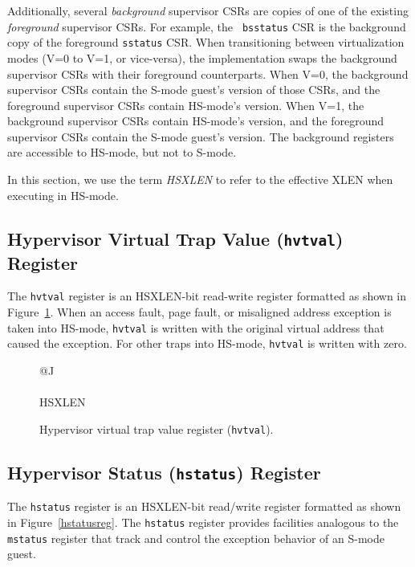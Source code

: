 Additionally, several {\em background} supervisor CSRs are copies of one of
the existing {\em foreground} supervisor CSRs.  For example, the {\tt
bsstatus} CSR is the background copy of the foreground {\tt sstatus} CSR.
When transitioning between virtualization modes (V=0 to V=1, or vice-versa),
the implementation swaps the background supervisor CSRs with their foreground
counterparts.  When V=0, the background supervisor CSRs contain the S-mode
guest's version of those CSRs, and the foreground supervisor CSRs contain
HS-mode's version.  When V=1, the background supervisor CSRs contain HS-mode's
version, and the foreground supervisor CSRs contain the S-mode guest's
version.  The background registers are accessible to HS-mode, but not to S-mode.

In this section, we use the term {\em HSXLEN} to refer to the effective XLEN
when executing in HS-mode.

\subsection{Hypervisor Virtual Trap Value ({\tt hvtval}) Register}

The {\tt hvtval} register is an HSXLEN-bit read-write register formatted as shown
in Figure~\ref{hvtvalreg}.  When an access fault, page fault, or misaligned
address exception is taken into HS-mode, {\tt hvtval} is
written with the original virtual address that caused the exception.
For other traps into HS-mode, {\tt hvtval} is written with zero.

\begin{figure}[h!]
{\footnotesize
\begin{center}
\begin{tabular}{@{}J}
 \\
\hline
{} \\
\hline
HSXLEN \\
\end{tabular}
\end{center}
}
\vspace{-0.1in}
\caption{Hypervisor virtual trap value register ({\tt hvtval}).}
\label{hvtvalreg}
\end{figure}

\subsection{Hypervisor Status ({\tt hstatus}) Register}

The {\tt hstatus} register is an HSXLEN-bit read/write register
formatted as shown in Figure~\ref{hstatusreg}.  The {\tt hstatus}
register provides facilities analogous to the {\tt mstatus} register
that track and control the exception behavior of an S-mode guest.

